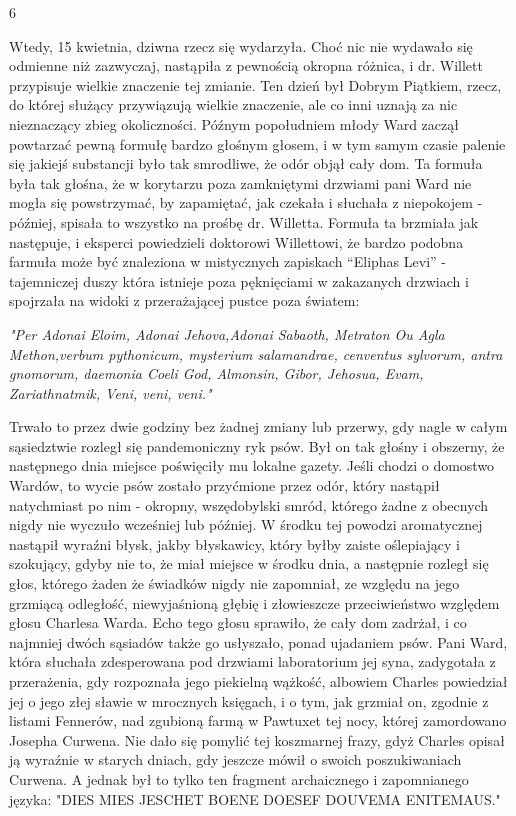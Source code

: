 \begin{center}
6
\end{center}

Wtedy, 15 kwietnia, dziwna rzecz się wydarzyła. Choć nic nie wydawało się odmienne niż zazwyczaj, nastąpiła z pewnością okropna różnica, i dr. Willett przypisuje wielkie znaczenie tej zmianie. Ten dzień był Dobrym Piątkiem, rzecz, do której służący przywiązują wielkie znaczenie, ale co inni uznają za nic nieznaczący zbieg okoliczności. Późnym popołudniem młody Ward zaczął powtarzać pewną formułę bardzo głośnym głosem, i w tym samym czasie palenie się jakiejś substancji było tak smrodliwe, że odór objął cały dom. Ta formuła była tak głośna, że w korytarzu poza zamkniętymi drzwiami pani Ward nie mogła się powstrzymać, by zapamiętać, jak czekała i słuchała z niepokojem - później, spisała to wszystko na prośbę dr. Willetta. Formuła ta brzmiała jak następuje, i eksperci powiedzieli doktorowi Willettowi, że bardzo podobna farmuła może być znaleziona w mistycznych zapiskach ``Eliphas Levi'' - tajemniczej duszy która istnieje poza pęknięciami w zakazanych drzwiach i spojrzała na widoki z przerażającej pustce poza światem:

\begin{displayquote}
\textit{"Per Adonai Eloim, Adonai Jehova,\break Adonai Sabaoth, Metraton Ou Agla Methon,\break verbum pythonicum, mysterium salamandrae, \break cenventus sylvorum, antra gnomorum, \break daemonia Coeli God, Almonsin, Gibor, \break Jehosua, Evam, Zariathnatmik, Veni, veni, veni."}
\end{displayquote}

Trwało to przez dwie godziny bez żadnej zmiany lub przerwy, gdy nagle w całym sąsiedztwie rozległ się pandemoniczny ryk psów. Był on tak głośny i obszerny, że następnego dnia miejsce poświęciły mu lokalne gazety. Jeśli chodzi o domostwo Wardów, to wycie psów zostało przyćmione przez odór, który nastąpił natychmiast po nim - okropny, wszędobylski smród, którego żadne z obecnych nigdy nie wyczuło wcześniej lub później. W środku tej powodzi aromatycznej nastąpił wyraźni błysk, jakby błyskawicy, który byłby zaiste oślepiający i szokujący, gdyby nie to, że miał miejsce w środku dnia, a następnie rozległ się głos, którego żaden że świadków nigdy nie zapomniał, ze względu na jego grzmiącą odległość, niewyjaśnioną głębię i złowieszcze przeciwieństwo względem głosu Charlesa Warda. Echo tego głosu sprawiło, że cały dom zadrżał, i co najmniej dwóch sąsiadów także go usłyszało, ponad ujadaniem psów. Pani Ward, która słuchała zdesperowana pod drzwiami laboratorium jej syna, zadygotała z przerażenia, gdy rozpoznała jego piekielną wążkość, albowiem Charles powiedział jej o jego złej sławie w mrocznych księgach, i o tym, jak grzmiał on, zgodnie z listami Fennerów, nad zgubioną farmą w Pawtuxet tej nocy, której zamordowano Josepha Curwena. Nie dało się pomylić tej koszmarnej frazy, gdyż Charles opisał ją wyraźnie w starych dniach, gdy jeszcze mówił o swoich poszukiwaniach Curwena. A jednak był to tylko ten fragment archaicznego i zapomnianego języka: "DIES MIES JESCHET BOENE DOESEF DOUVEMA ENITEMAUS."

